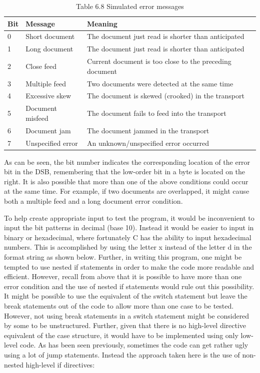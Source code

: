 \documentclass[10pt]{article}
\begin{document}
\begin{table}[h]
\begin{center}
\captionsetup{labelformat=empty}
\caption{Table 6.8 Simulated error messages}
\begin{tabular}{|l|l|l|}
\hline
Bit & Message & Meaning \\
\hline
0 & Short document & The document just read is shorter than anticipated \\
\hline
1 & Long document & The document just read is shorter than anticipated \\
\hline
2 & Close feed & Current document is too close to the preceding document \\
\hline
3 & Multiple feed & Two documents were detected at the same time \\
\hline
4 & Excessive skew & The document is skewed (crooked) in the transport \\
\hline
5 & Document misfeed & The document fails to feed into the transport \\
\hline
6 & Document jam & The document jammed in the transport \\
\hline
7 & Unspecified error & An unknown/unspecified error occurred \\
\hline
\end{tabular}
\end{center}
\end{table}

As can be seen, the bit number indicates the corresponding location of the error bit in the DSB, remembering that the low-order bit in a byte is located on the right. It is also possible that more than one of the above conditions could occur at the same time. For example, if two documents are overlapped, it might cause both a multiple feed and a long document error condition.

To help create appropriate input to test the program, it would be inconvenient to input the bit patterns in decimal (base 10). Instead it would be easier to input in binary or hexadecimal, where fortunately C has the ability to input hexadecimal numbers. This is accomplished by using the letter x instead of the letter d in the format string as shown below. Further, in writing this program, one might be tempted to use nested if statements in order to make the code more readable and efficient. However, recall from above that it is possible to have more than one error condition and the use of nested if statements would rule out this possibility. It might be possible to use the equivalent of the switch statement but leave the break statements out of the code to allow more than one case to be tested. However, not using break statements in a switch statement might be considered by some to be unstructured. Further, given that there is no high-level directive equivalent of the case structure, it would have to be implemented using only low-level code. As has been seen previously, sometimes the code can get rather ugly using a lot of jump statements. Instead the approach taken here is the use of non-nested high-level if directives:
\end{document}
